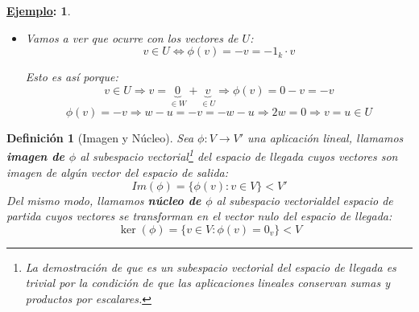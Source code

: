 \documentclass[10pt,a4paper,openright]{book}
\theoremstyle{break}
\newtheorem*{defi}{Definición}
\newtheorem*{ej}{\underline{Ejemplo}:}
\begin{document}
\begin{ej}
\begin{itemize}
\begin{itemize}
Esto es así porque:
$$v\in W\Rightarrow v=\underbrace{v}_{\in W}+\underbrace{0}_{\in U}\Rightarrow \phi(v)=v-0=v$$
$$\phi(v)=v\Rightarrow w-u=v=\underbrace{w}_{=v}+u\Rightarrow 2u=0\Rightarrow v=w\in W$$

\item Vamos a ver que ocurre con los vectores de $U$:
$$v\in U\Leftrightarrow \phi(v)=-v=-1_k\cdot v$$

Esto es así porque:
$$v\in U\Rightarrow v=\underbrace{0}_{\in W}+\underbrace{v}_{\in U}\Rightarrow \phi(v)=0-v=-v$$
$$\phi(v)=-v\Rightarrow w-u=-v=-w-u\Rightarrow 2w=0\Rightarrow v=u\in U$$
\end{itemize}
\end{itemize}
\end{ej}

\begin{defi}[Imagen y Núcleo]
Sea $\phi: V\longrightarrow V'$ una aplicación lineal, llamamos \textbf{imagen de $\phi$} al subespacio vectorial\footnote{La demostración de que es un subespacio vectorial del espacio de llegada es trivial por la condición de que las aplicaciones lineales conservan sumas y productos por escalares.} del espacio de llegada cuyos vectores son imagen de algún vector del espacio de salida:
$$
Im(\phi)=\{\phi(v): v\in V\}<V'
$$
Del mismo modo, llamamos \textbf{núcleo de $\phi$} al subespacio vectorial\footnotemark[7] del espacio de partida cuyos vectores se transforman en el vector nulo del espacio de llegada:
$$
\ker(\phi)=\{v\in V: \phi(v)=0_v\}<V
$$
\end{defi}
\end{document}
